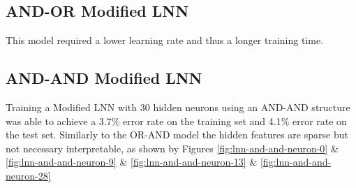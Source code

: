 \subsection{AND-OR Modified LNN}
This model required a lower learning rate and thus a longer training time.
\subsection{AND-AND Modified LNN}
Training a Modified LNN with 30 hidden neurons using an AND-AND structure was able to achieve a 3.7\% error rate on the training set and 4.1\% error rate on the test set. Similarly to the OR-AND model the hidden features are sparse but not necessary interpretable, as shown by Figures \ref{fig:lnn-and-and-neuron-0} \& \ref{fig:lnn-and-and-neuron-9} \& \ref{fig:lnn-and-and-neuron-13} \& \ref{fig:lnn-and-and-neuron-28}

